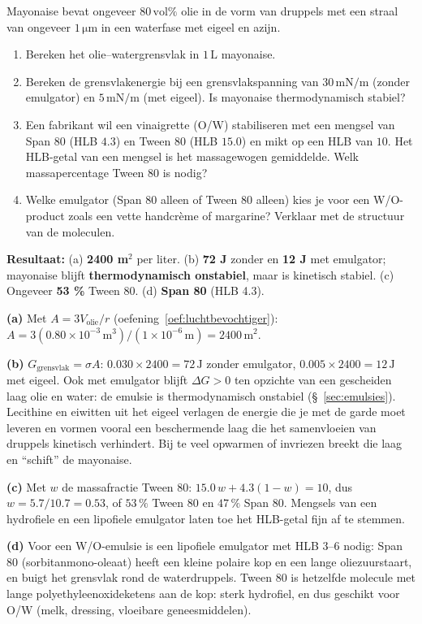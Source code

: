 \begin{oefening}
Mayonaise bevat ongeveer \(80\,\mathrm{vol\%}\) olie in de vorm van druppels met een straal van ongeveer \(1\,\mathrm{\mu m}\) in een waterfase met eigeel en azijn.

\begin{enumerate}
\item[(a)]
  Bereken het olie--watergrensvlak in \(1\,\mathrm{L}\) mayonaise.
\item[(b)]
  Bereken de grensvlakenergie bij een grensvlakspanning van \(30\,\mathrm{mN/m}\) (zonder emulgator) en \(5\,\mathrm{mN/m}\) (met eigeel). Is mayonaise thermodynamisch stabiel?
\item[(c)]
  Een fabrikant wil een vinaigrette (O/W) stabiliseren met een mengsel van Span 80 (HLB \(4.3\)) en Tween 80 (HLB \(15.0\)) en mikt op een HLB van \(10\). Het HLB-getal van een mengsel is het massagewogen gemiddelde. Welk massapercentage Tween 80 is nodig?
\item[(d)]
  Welke emulgator (Span 80 alleen of Tween 80 alleen) kies je voor een W/O-product zoals een vette handcrème of margarine? Verklaar met de structuur van de moleculen.
\end{enumerate}
\end{oefening}
\begin{oplossing}
\textbf{Resultaat:} (a) \textbf{2400 m\ensuremath{^{2}}} per liter. (b) \textbf{72 J} zonder en \textbf{12 J} met emulgator; mayonaise blijft \textbf{thermodynamisch onstabiel}, maar is kinetisch stabiel. (c) Ongeveer \textbf{53 \%} Tween 80. (d) \textbf{Span 80} (HLB 4.3).

\textbf{(a)} Met \(A = 3V_{\text{olie}}/r\) (oefening~\ref{oef:luchtbevochtiger}): \(A = 3(0.80\times10^{-3}\,\mathrm{m^3})/(1\times10^{-6}\,\mathrm{m}) = 2400\,\mathrm{m^2}\).

\textbf{(b)} \(G_{\text{grensvlak}} = \sigma A\): \(0.030 \times 2400 = 72\,\mathrm{J}\) zonder emulgator, \(0.005 \times 2400 = 12\,\mathrm{J}\) met eigeel. Ook met emulgator blijft \(\Delta G > 0\) ten opzichte van een gescheiden laag olie en water: de emulsie is thermodynamisch onstabiel (\S~\ref{sec:emulsies}). Lecithine en eiwitten uit het eigeel verlagen de energie die je met de garde moet leveren en vormen vooral een beschermende laag die het samenvloeien van druppels kinetisch verhindert. Bij te veel opwarmen of invriezen breekt die laag en ``schift'' de mayonaise.

\textbf{(c)} Met \(w\) de massafractie Tween 80: \(15.0\,w + 4.3(1 - w) = 10\), dus \(w = 5.7/10.7 = 0.53\), of \(53\,\%\) Tween 80 en \(47\,\%\) Span 80. Mengsels van een hydrofiele en een lipofiele emulgator laten toe het HLB-getal fijn af te stemmen.

\textbf{(d)} Voor een W/O-emulsie is een lipofiele emulgator met HLB \(3\)--\(6\) nodig: Span 80 (sorbitanmono-oleaat) heeft een kleine polaire kop en een lange oliezuurstaart, en buigt het grensvlak rond de waterdruppels. Tween 80 is hetzelfde molecule met lange polyethyleenoxideketens aan de kop: sterk hydrofiel, en dus geschikt voor O/W (melk, dressing, vloeibare geneesmiddelen).
\end{oplossing}

